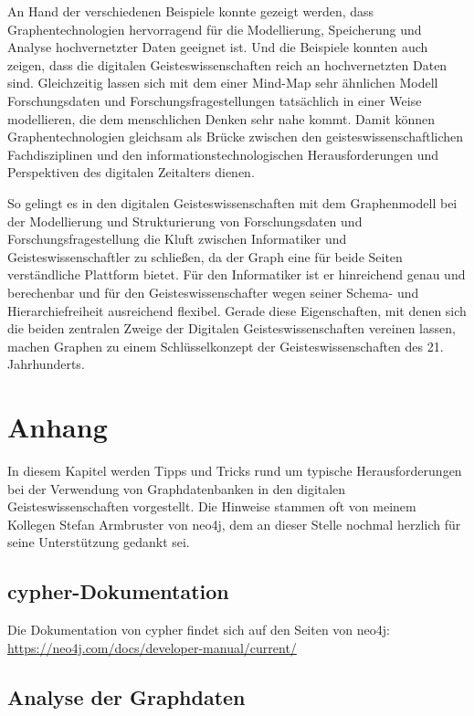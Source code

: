 An Hand der verschiedenen Beispiele konnte gezeigt werden, dass
Graphentechnologien hervorragend für die Modellierung, Speicherung und
Analyse hochvernetzter Daten geeignet ist. Und die Beispiele konnten
auch zeigen, dass die digitalen Geisteswissenschaften reich an
hochvernetzten Daten sind. Gleichzeitig lassen sich mit dem einer
Mind-Map sehr ähnlichen Modell Forschungsdaten und
Forschungsfragestellungen tatsächlich in einer Weise modellieren, die
dem menschlichen Denken sehr nahe kommt. Damit können
Graphentechnologien gleichsam als Brücke zwischen den
geisteswissenschaftlichen Fachdisziplinen und den
informationstechnologischen Herausforderungen und Perspektiven des
digitalen Zeitalters dienen.

So gelingt es in den digitalen Geisteswissenschaften mit dem
Graphenmodell bei der Modellierung und Strukturierung von
Forschungsdaten und Forschungsfragestellung die Kluft zwischen
Informatiker und Geisteswissenschaftler zu schließen, da der Graph eine
für beide Seiten verständliche Plattform bietet. Für den Informatiker
ist er hinreichend genau und berechenbar und für den
Geisteswissenschafter wegen seiner Schema- und Hierarchiefreiheit
ausreichend flexibel. Gerade diese Eigenschaften, mit denen sich die
beiden zentralen Zweige der Digitalen Geisteswissenschaften vereinen
lassen, machen Graphen zu einem Schlüsselkonzept der
Geisteswissenschaften des 21. Jahrhunderts.

\hypertarget{anhang}{%
\section{Anhang}\label{anhang}}

In diesem Kapitel werden Tipps und Tricks rund um typische
Herausforderungen bei der Verwendung von Graphdatenbanken in den
digitalen Geisteswissenschaften vorgestellt. Die Hinweise stammen oft
von meinem Kollegen Stefan Armbruster von neo4j, dem an dieser Stelle
nochmal herzlich für seine Unterstützung gedankt sei.

\hypertarget{cypher-dokumentation}{%
\subsection{cypher-Dokumentation}\label{cypher-dokumentation}}

Die Dokumentation von cypher findet sich auf den Seiten von neo4j:
\url{https://neo4j.com/docs/developer-manual/current/}

\hypertarget{analyse-der-graphdaten}{%
\subsection{Analyse der Graphdaten}\label{analyse-der-graphdaten}}

